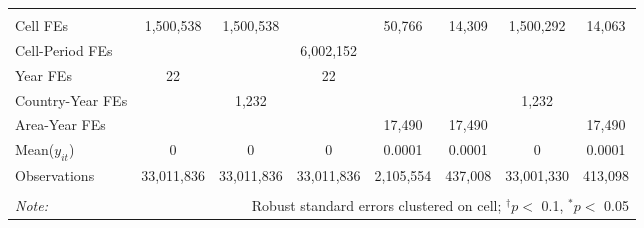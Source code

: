 \begin{table}[ht!]
\begin{tabular}{@{\extracolsep{0pt}}lccccccc}
\hline \\[-1.8ex] Cell FEs & 1,500,538 & 1,500,538 &  & 50,766 & 14,309 & 1,500,292 & 14,063 \\ 
Cell-Period FEs &  &  & 6,002,152 &  &  &  &  \\ 
Year FEs & 22 &  & 22 &  &  &  &  \\ 
Country-Year FEs &  & 1,232 &  &  &  & 1,232 &  \\ 
Area-Year FEs &  &  &  & 17,490 & 17,490 &  & 17,490 \\ 
Mean($y_{it}$) & 0 & 0 & 0 & 0.0001 & 0.0001 & 0 & 0.0001 \\ 
Observations & 33,011,836 & 33,011,836 & 33,011,836 & 2,105,554 & 437,008 & 33,001,330 & 413,098 \\ 
\hline 
\hline \\[-1.8ex] 
\textit{Note:}  & \multicolumn{7}{r}{Robust standard errors clustered on cell; $^{\dagger} p <$ 0.1, $^*p <$ 0.05} \\ 
\end{tabular} 
\end{table} 
